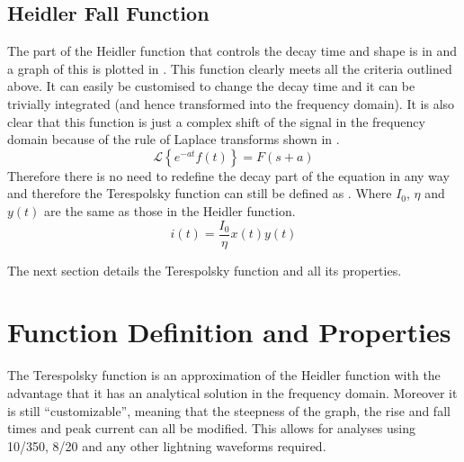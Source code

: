 \subsection{Heidler Fall Function}
\label{sub:heidler_fall_function}

The part of the Heidler function that controls the decay time and shape is in  and a graph of this is plotted in . This function clearly meets all the criteria outlined above. It can easily be customised to change the decay time and it can be trivially integrated (and hence transformed into the frequency domain).
It is also clear that this function is just a complex shift of the signal in the frequency domain because of the rule of Laplace transforms shown in  \cite{bkSST,bkControl}.
\begin{equation}
    \mathcal{L} \left \{ e^{-at}f\left ( t \right ) \right \} = F \left (s + a \right )
    \label{eqn:laplaceComplexShift}
\end{equation}
Therefore there is no need to redefine the decay part of the equation in any way and therefore the Terespolsky function can still be defined as . Where $I_0$, $\eta$ and $y(t)$ are the same as those in the Heidler function.
\begin{equation}
i(t) = \frac{I_0}{\eta} x \left( t \right) y \left( t \right)
\label{eqn:PreTFSmall}
\end{equation}

The next section details the Terespolsky function and all its properties.


\section{Function Definition and Properties}
\label{sec:function_definition_and_properties}

The Terespolsky function is an approximation of the Heidler function with the advantage that it has an analytical solution in the frequency domain. Moreover it is still ``customizable'', meaning that the steepness of the graph, the rise and fall times and peak current can all be modified. This allows for analyses using 10/350, 8/20 and any other lightning waveforms required.

